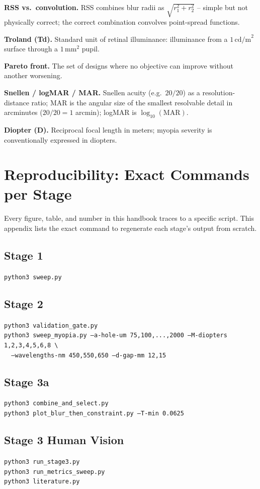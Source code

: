 \documentclass[11pt]{report}
\begin{document}
\textbf{RSS vs.\ convolution.} RSS combines blur radii as $\sqrt{r_1^2+r_2^2}$ -- simple but not physically correct; the correct combination convolves point-spread functions.

\textbf{Troland (Td).} Standard unit of retinal illuminance: illuminance from a $1\,\text{cd/m}^2$ surface through a $1\,\text{mm}^2$ pupil.

\textbf{Pareto front.} The set of designs where no objective can improve without another worsening.

\textbf{Snellen / logMAR / MAR.} Snellen acuity (e.g.\ $20/20$) as a resolution-distance ratio; MAR is the angular size of the smallest resolvable detail in arcminutes ($20/20 = 1$ arcmin); logMAR is $\log_{10}(\text{MAR})$.

\textbf{Diopter (D).} Reciprocal focal length in meters; myopia severity is conventionally expressed in diopters.

\chapter{Reproducibility: Exact Commands per Stage}
\label{app:reproduce}
Every figure, table, and number in this handbook traces to a specific script. This appendix lists the exact command to regenerate each stage's output from scratch.

\section*{Stage 1}
\texttt{python3 sweep.py}

\section*{Stage 2}
\texttt{python3 validation\_gate.py}\\
\texttt{python3 sweep\_myopia.py --a-hole-um 75,100,...,2000 --M-diopters 1,2,3,4,5,6,8 \textbackslash} \\
\texttt{\ \ --wavelengths-nm 450,550,650 --d-gap-mm 12,15}

\section*{Stage 3a}
\texttt{python3 combine\_and\_select.py} \\
\texttt{python3 plot\_blur\_then\_constraint.py --T-min 0.0625}

\section*{Stage 3 Human Vision}
\texttt{python3 run\_stage3.py} \\
\texttt{python3 run\_metrics\_sweep.py} \\
\texttt{python3 literature.py}
\end{document}

